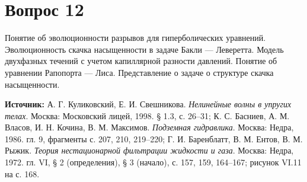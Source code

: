 \documentclass[12pt,a4paper]{article}
\begin{document}
\section*{Вопрос 12}
Понятие об эволюционности разрывов для гиперболических уравнений. Эволюционность скачка насыщенности в задаче Бакли — Леверетта. Модель двухфазных течений с учетом капиллярной разности давлений. Понятие об уравнении Рапопорта — Лиса. Представление о задаче о структуре скачка насыщенности.

\medskip
\noindent\textbf{Источник:} А. Г. Куликовский, Е. И. Свешникова. \textit{Нелинейные волны в упругих телах}. Москва: Московский лицей, 1998. § 1.3, с. 26--31; К. С. Басниев, А. М. Власов, И. Н. Кочина, В. М. Максимов. \textit{Подземная гидравлика}. Москва: Недра, 1986. гл. 9, фрагменты с. 207, 210, 219--220; Г. И. Баренблатт, В. М. Ентов, В. М. Рыжик. \textit{Теория нестационарной фильтрации жидкости и газа}. Москва: Недра, 1972. гл. VI, § 2 (определения), § 3 (начало), с. 157, 159, 164--167; рисунок VI.11 на с. 168.
\par\bigskip
\end{document}
